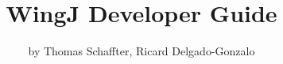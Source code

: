 



\def\newtitle{WingJ Developer Guide} %
\def\subtitle{Instructions for extending \wingj structure detection to additional biological systems}
\def\headerTitle{\newtitle} %
\def\revision{Version 1.0 Beta}
\def\year{2013}
\def\date{\today}

\def\titleImage{images/wingj-cover_300dpi.jpg}
\def\titleUrl{\wingjUrl}


\def\authornames{Thomas Schaffter, Ricard Delgado-Gonzalo}
\def\newauthor{by \authornames}
\def\email{thomas.schaffter@gmail.com}

\newcommand{\schaffterEmail}{\href{mailto:thomas.schaffter@gmail.com}{thomas.schaffter@gmail.com}\xspace}
\newcommand{\delgadoEmail}{\href{mailto:ricard.delgado@gmail.com}{ricard.delgado@gmail.com}\xspace}




\title{\newtitle}
\author{\newauthor}


\sffamily





\tableofcontents
\clearpage\thispagestyle{empty}\mbox{}\clearpage

